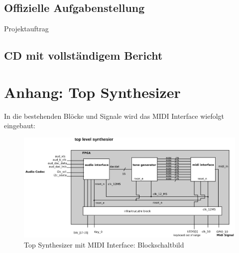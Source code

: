 


\appendix






\section{Offizielle Aufgabenstellung}\label{sect.verzeichnis_literatur}
Projektauftrag

\section{CD mit vollständigem Bericht}\label{sect.verzeichnis_literatur}


\chapter{Anhang: Top Synthesizer}\label{chap.anhang_top_synthesizer}

In die bestehenden Blöcke und Signale wird das MIDI Interface wiefolgt eingebaut:\\
\begin{figure}[H]
	\centering
	\includegraphics[width=1\textwidth]{images/midi_interface/top_synthesizer_block.png}
	\caption{Top Synthesizer mit MIDI Interface: Blockschaltbild}
	\label{fig.top_synthesizer_block}
\end{figure}

